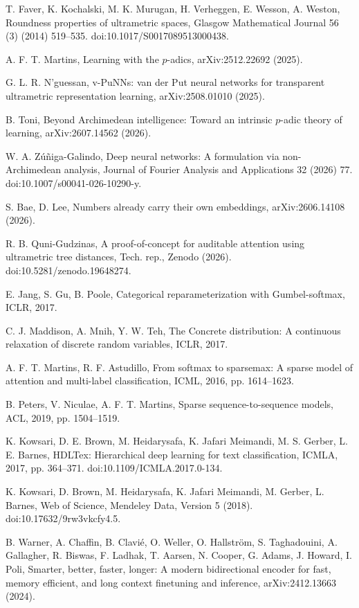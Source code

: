 \documentclass[preprint,11pt]{elsarticle}
\begin{document}
\begin{enumerate}[label={[\arabic*]},leftmargin=2.2em,itemsep=.28em,parsep=0pt]
\item T. Faver, K. Kochalski, M. K. Murugan, H. Verheggen, E. Wesson, A. Weston, Roundness properties of ultrametric spaces, Glasgow Mathematical Journal 56 (3) (2014) 519--535. doi:10.1017/S0017089513000438.
\item A. F. T. Martins, Learning with the $p$-adics, arXiv:2512.22692 (2025).
\item G. L. R. N'guessan, v-PuNNs: van der Put neural networks for transparent ultrametric representation learning, arXiv:2508.01010 (2025).
\item B. Toni, Beyond Archimedean intelligence: Toward an intrinsic $p$-adic theory of learning, arXiv:2607.14562 (2026).
\item W. A. Z\'u\~niga-Galindo, Deep neural networks: A formulation via non-Archimedean analysis, Journal of Fourier Analysis and Applications 32 (2026) 77. doi:10.1007/s00041-026-10290-y.
\item S. Bae, D. Lee, Numbers already carry their own embeddings, arXiv:2606.14108 (2026).
\item R. B. Quni-Gudzinas, A proof-of-concept for auditable attention using ultrametric tree distances, Tech. rep., Zenodo (2026). doi:10.5281/zenodo.19648274.
\item E. Jang, S. Gu, B. Poole, Categorical reparameterization with Gumbel-softmax, ICLR, 2017.
\item C. J. Maddison, A. Mnih, Y. W. Teh, The Concrete distribution: A continuous relaxation of discrete random variables, ICLR, 2017.
\item A. F. T. Martins, R. F. Astudillo, From softmax to sparsemax: A sparse model of attention and multi-label classification, ICML, 2016, pp. 1614--1623.
\item B. Peters, V. Niculae, A. F. T. Martins, Sparse sequence-to-sequence models, ACL, 2019, pp. 1504--1519.
\item K. Kowsari, D. E. Brown, M. Heidarysafa, K. Jafari Meimandi, M. S. Gerber, L. E. Barnes, HDLTex: Hierarchical deep learning for text classification, ICMLA, 2017, pp. 364--371. doi:10.1109/ICMLA.2017.0-134.
\item K. Kowsari, D. Brown, M. Heidarysafa, K. Jafari Meimandi, M. Gerber, L. Barnes, Web of Science, Mendeley Data, Version 5 (2018). doi:10.17632/9rw3vkcfy4.5.
\item B. Warner, A. Chaffin, B. Clavi\'e, O. Weller, O. Hallstr\"om, S. Taghadouini, A. Gallagher, R. Biswas, F. Ladhak, T. Aarsen, N. Cooper, G. Adams, J. Howard, I. Poli, Smarter, better, faster, longer: A modern bidirectional encoder for fast, memory efficient, and long context finetuning and inference, arXiv:2412.13663 (2024).
\end{enumerate}
\end{document}
